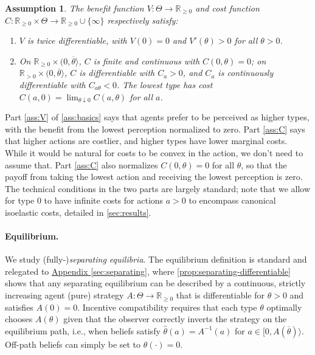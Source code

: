 \documentclass[12 pt]{article}
\newcommand{\appendixref}[1]{\hyperref[#1]{Appendix \ref{#1}}}
\newtheorem{assumption}{Assumption}
\theoremstyle{remark}
\theoremstyle{definition}
\newcommand{\R}{\mathbb{R}}
\newcommand{\Rpos}{\R_{\geq0}}
\newcommand{\Rstrpos}{\R_{>0}}
\def\typemin{0}
\def\typemax{\overline \theta}
\begin{document}
\begin{assumption}The benefit function $V: \Theta \to \Rpos$ and cost function $C: \Rpos \times \Theta \to \Rpos \cup \{\infty\}$ respectively satisfy:
\label{ass:basics}
\begin{enumerate}
\item \label{ass:V} $V$ is twice %
differentiable, with $V(\typemin) = 0$ and $V'(\theta) > 0$ for all $\theta > \typemin$.
\item \label{ass:C} On $\Rpos \times (\typemin,\typemax\rangle$, $C$ is finite and continuous with $C(0,\theta)=0$; on $\Rstrpos \times (\typemin,\typemax\rangle$, $C$ is %
differentiable with $C_a>0$, and $C_a$ is continuously differentiable with $C_{a\theta} < 0$. The lowest type has cost $C(a,\typemin)=\lim_{\theta \downarrow \typemin} C(a, \theta)$ for all $a$.
\end{enumerate}
\end{assumption}


Part \ref{ass:V} of \autoref{ass:basics} says that agents prefer to be perceived as higher types, with the benefit from the lowest perception normalized to zero. Part \ref{ass:C} says that higher actions are costlier, %
and higher types have lower marginal costs. While it would be natural for costs to be convex in the action, we don't need to assume that. Part \ref{ass:C} also normalizes $C(0,\theta) = 0$ for all $\theta$, so that the payoff from taking the lowest action and receiving the lowest perception is zero. The technical conditions in the two parts are largely standard; note that we allow for type $\typemin$ to have infinite costs for actions $a>0$ to encompass canonical isoelastic costs, detailed in \autoref{sec:results}.

\paragraph{Equilibrium.} We study (fully-)\emph{separating equilibria}. The equilibrium definition is standard and relegated to \appendixref{sec:separating}, where \autoref{prop:separating-differentiable} shows that any separating equilibrium can be described by a continuous, strictly increasing agent (pure) strategy $A: \Theta \to \Rpos$ that is differentiable for $\theta>0$ and satisfies $A(\typemin) = 0$.  Incentive compatibility requires that each type $\theta$ optimally chooses $A(\theta)$ given that the observer correctly inverts the strategy on the equilibrium path, i.e., when beliefs satisfy $\hat\theta(a) = A^{-1}(a)$ for $a \in [0, A(\typemax)\rangle$. Off-path beliefs can simply be set to $\hat \theta(\cdot)=\typemin$. 
\end{document}
